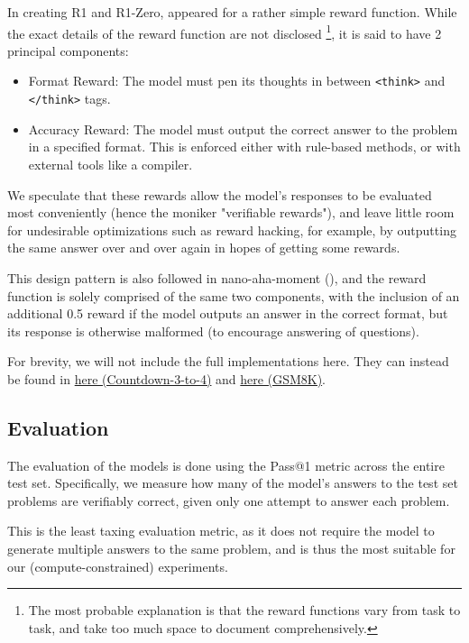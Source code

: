 \documentclass{article} %
\theoremstyle{definition}
\begin{document}
In creating R1 and R1-Zero, \cite{r1} appeared for a rather simple reward function.
While the exact details of the reward function are not disclosed \footnote{
    The most probable explanation is that the reward functions 
    vary from task to task, and take too much space to document comprehensively.
}, it is said to have 2 principal components:
\begin{itemize}
    \item Format Reward: The model must pen its thoughts in between \texttt{<think>} and \texttt{</think>} tags.
    \item Accuracy Reward: The model must output the correct answer to the problem in a specified format.
    This is enforced either with rule-based methods, or with external tools like a compiler.
\end{itemize}

We speculate that these rewards allow the model's responses to be evaluated most conveniently
(hence the moniker "verifiable rewards"), and leave little room for undesirable optimizations
such as reward hacking, for example, by outputting the same answer over and over again
in hopes of getting some rewards.

This design pattern is also followed in nano-aha-moment (\cite{nano-aha-moment}),
and the reward function is solely comprised of the same two components,
with the inclusion of an additional 0.5 reward if the model outputs an answer in the correct format,
but its response is otherwise malformed (to encourage answering of questions).

For brevity, we will not include the full implementations here. They can instead
be found in \href{../../code/nano-aha-moment/nano_r1_script.py}{here (Countdown-3-to-4)} and 
\href{../../code/nano-aha-moment/nano_r1_gsm8k.py}{here (GSM8K)}.

\subsection{Evaluation}
The evaluation of the models is done using the Pass@1 metric across the entire test set.
Specifically, we measure how many of the model's answers to the test set problems
are verifiably correct, given only one attempt to answer each problem.

This is the least taxing evaluation metric, as it does not require the model to
generate multiple answers to the same problem, and is thus the most suitable for our 
(compute-constrained) experiments.
\end{document}
